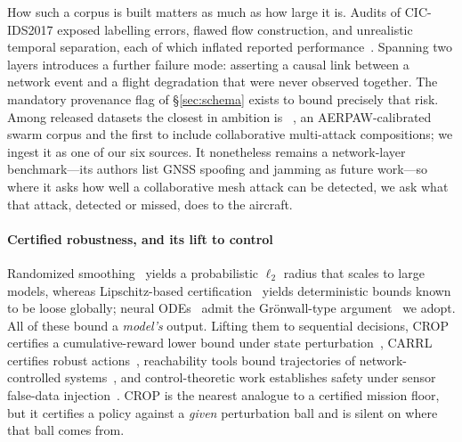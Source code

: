 How such a corpus is built matters as much as how large it is. Audits of
CIC-IDS2017 exposed labelling errors, flawed flow construction, and unrealistic
temporal separation, each of which inflated reported
performance~\cite{engelen2021troubleshooting,sharafaldin2018cicids}. Spanning
two layers introduces a further failure mode: asserting a causal link between a
network event and a flight degradation that were never observed together. The
mandatory provenance flag of \S\ref{sec:schema} exists to bound precisely that
risk. Among released datasets the closest in ambition is
~\cite{uavcas2026}, an AERPAW-calibrated swarm corpus and the
first to include collaborative multi-attack compositions; we ingest it as one of
our six sources. It nonetheless remains a network-layer benchmark---its authors
list GNSS spoofing and jamming as future work---so where it asks how well a
collaborative mesh attack can be detected, we ask what that attack, detected or
missed, does to the aircraft.

\paragraph{Certified robustness, and its lift to control}
Randomized smoothing~\cite{cohen2019smoothing,salman2019provably} yields a
probabilistic $\ell_2$ radius that scales to large models, whereas
Lipschitz-based certification~\cite{pauli2022training,zhang2022rethinking}
yields deterministic bounds known to be loose globally; neural
ODEs~\cite{chen2018neuralode} admit the Gr\"onwall-type
argument~\cite{yan2020robustnode} we adopt. All of these bound a \emph{model's}
output. Lifting them to sequential decisions, CROP certifies a cumulative-reward
lower bound under state perturbation~\cite{wu2022crop}, CARRL certifies robust
actions~\cite{everett2021carrl}, reachability tools bound trajectories of
network-controlled systems~\cite{ivanov2019verisig,tran2020nnv}, and
control-theoretic work establishes safety under sensor false-data
injection~\cite{li2022lqg}. CROP is the nearest analogue to a certified mission
floor, but it certifies a policy against a \emph{given} perturbation ball and is
silent on where that ball comes from.

